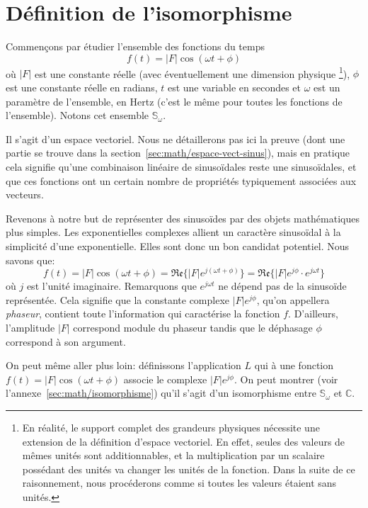 \section{Définition de l'isomorphisme}
Commençons par étudier l'ensemble des fonctions du temps
\[
    f(t) = |F|\cos(\omega t + \phi)
\]
où $|F|$ est une constante réelle (avec éventuellement une dimension physique
\footnote{
    En réalité, le support complet des grandeurs physiques
    nécessite une extension de la définition d'espace vectoriel.
    En effet, seules des valeurs de mêmes unités sont additionnables,
    et la multiplication par un scalaire possédant des unités
    va changer les unités de la fonction.
    Dans la suite de ce raisonnement,
    nous procéderons comme si toutes les valeurs étaient sans unités.
}),
$\phi$ est une constante réelle en radians,
$t$ est une variable en secondes
et $\omega$ est un paramètre de l'ensemble, en Hertz
(c'est le même pour toutes les fonctions de l'ensemble).
Notons cet ensemble $\mathbb{S}_\omega$.

Il s'agit d'un espace vectoriel.
Nous ne détaillerons pas ici la preuve
(dont une partie se trouve dans la section~\ref{sec:math/espace-vect-sinus}),
mais en pratique cela signifie qu'une combinaison linéaire
de sinusoïdales reste une sinusoïdales,
et que ces fonctions ont un certain nombre de propriétés
typiquement associées aux vecteurs.

Revenons à notre but de représenter des sinusoïdes
par des objets mathématiques plus simples.
Les exponentielles complexes allient un caractère sinusoïdal à
la simplicité d'une exponentielle.
Elles sont donc un bon candidat potentiel.
Nous savons que:
\begin{equation}
    f(t) = |F|\cos(\omega t + \phi) = \mathfrak{Re}\{|F|e^{j(\omega t + \phi)}\}
    = \mathfrak{Re}\{|F|e^{j\phi}\cdot e^{j\omega t}\}
\end{equation}
où $j$ est l'unité imaginaire.
Remarquons que $e^{j\omega t}$ ne dépend pas de la sinusoïde représentée.
Cela signifie que la constante complexe $|F|e^{j\phi}$,
qu'on appellera \emph{phaseur}, contient
toute l'information qui caractérise la fonction $f$.
D'ailleurs, l'amplitude $|F|$ correspond module du phaseur
tandis que le déphasage $\phi$ correspond à son argument.

On peut même aller plus loin: définissons l'application $L$
qui à une fonction $f(t) = |F|\cos(\omega t + \phi)$
associe le complexe $|F|e^{j\phi}$.
On peut montrer (voir l'annexe~\ref{sec:math/isomorphisme}) qu'il s'agit d'un
isomorphisme entre $\mathbb{S}_\omega$ et $\mathbb{C}$.


